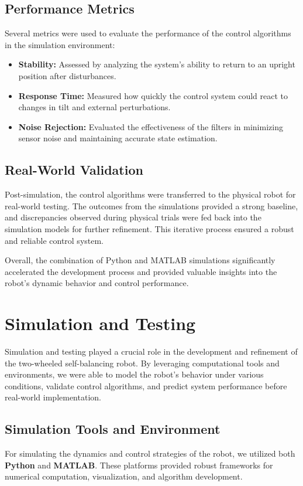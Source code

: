 \subsection{Performance Metrics}
Several metrics were used to evaluate the performance of the control algorithms in the simulation environment:

\begin{itemize}
\item \textbf{Stability:} Assessed by analyzing the system's ability to return to an upright position after disturbances.
\item \textbf{Response Time:} Measured how quickly the control system could react to changes in tilt and external perturbations.
\item \textbf{Noise Rejection:} Evaluated the effectiveness of the filters in minimizing sensor noise and maintaining accurate state estimation.
\end{itemize}

\subsection{Real-World Validation}
Post-simulation, the control algorithms were transferred to the physical robot for real-world testing. The outcomes from the simulations provided a strong baseline, and discrepancies observed during physical trials were fed back into the simulation models for further refinement. This iterative process ensured a robust and reliable control system.

Overall, the combination of Python and MATLAB simulations significantly accelerated the development process and provided valuable insights into the robot's dynamic behavior and control performance.

\section{Simulation and Testing}

Simulation and testing played a crucial role in the development and refinement of the two-wheeled self-balancing robot. By leveraging computational tools and environments, we were able to model the robot's behavior under various conditions, validate control algorithms, and predict system performance before real-world implementation.

\subsection{Simulation Tools and Environment}
For simulating the dynamics and control strategies of the robot, we utilized both \textbf{Python} and \textbf{MATLAB}. These platforms provided robust frameworks for numerical computation, visualization, and algorithm development.

